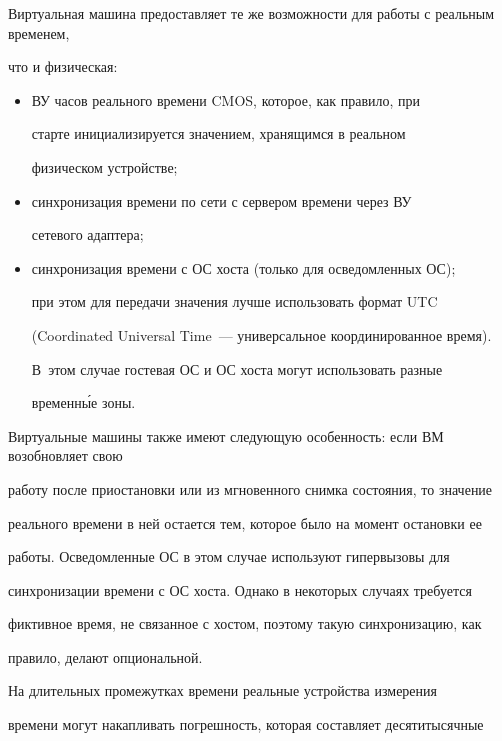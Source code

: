      


Виртуальная машина предоставляет те же возможности для работы с реальным временем, 


что и физическая: 


     \begin{itemize} %


\item ВУ часов реального времени CMOS, которое, как правило, при 


старте инициализируется значением, хранящимся в  реальном 


физическом устройстве;


\item синхронизация времени по сети с сервером времени через ВУ 


сетевого адаптера;


\item синхронизация времени с ОС хоста (только для осведомленных ОС); 


при этом для передачи значения лучше использовать формат UTC 


(Coordinated Universal Time~--- универсальное координированное время). 


В~этом случае гостевая ОС и ОС хоста могут использовать разные 


временн\'{ы}е зоны.


\end{itemize}





Виртуальные машины также имеют следующую особенность: если ВМ возобновляет свою 


работу после приостановки или из мгновенного снимка состояния, то значение 


реального времени в ней остается тем, которое было на момент остановки ее 


работы. Осведомленные ОС в этом случае используют гипервызовы для 


синхронизации времени с ОС хоста. Однако в некоторых случаях требуется 


фиктивное время, не связанное с хостом, поэтому такую синхронизацию, как 


правило, делают опциональной.


     


     На длительных промежутках времени реальные устройства измерения 


времени могут накапливать погрешность, которая составляет десятитысячные 


